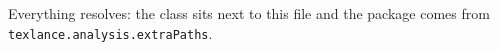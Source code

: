 \documentclass{localarticle}
\begin{document}
Everything resolves: the class sits next to this file and the package
comes from \texttt{texlance.analysis.extraPaths}.
\end{document}
